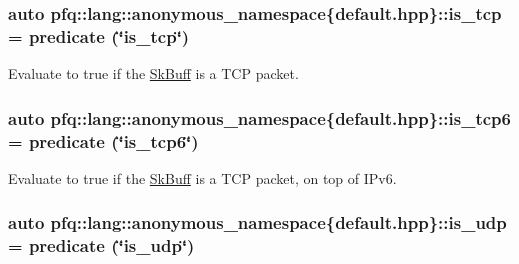 \hypertarget{namespacepfq_1_1lang_1_1anonymous__namespace_02default_8hpp_03_a67fe3072aa5353c1526aa04320d40137}{
\subsubsection[{is\+\_\+tcp}]{\setlength{\rightskip}{0pt plus 5cm}auto pfq\+::lang\+::anonymous\+\_\+namespace\{default.\+hpp\}\+::is\+\_\+tcp = {\bf predicate} (\char`\"{}is\+\_\+tcp\char`\"{})}}\label{namespacepfq_1_1lang_1_1anonymous__namespace_02default_8hpp_03_a67fe3072aa5353c1526aa04320d40137}


Evaluate to {\ttfamily true} if the \hyperlink{structpfq_1_1lang_1_1SkBuff}{Sk\+Buff} is a T\+C\+P packet. 

\hypertarget{namespacepfq_1_1lang_1_1anonymous__namespace_02default_8hpp_03_a56d9bafc51ca6775da4ec3b816b1c7bb}{
\subsubsection[{is\+\_\+tcp6}]{\setlength{\rightskip}{0pt plus 5cm}auto pfq\+::lang\+::anonymous\+\_\+namespace\{default.\+hpp\}\+::is\+\_\+tcp6 = {\bf predicate} (\char`\"{}is\+\_\+tcp6\char`\"{})}}\label{namespacepfq_1_1lang_1_1anonymous__namespace_02default_8hpp_03_a56d9bafc51ca6775da4ec3b816b1c7bb}


Evaluate to {\ttfamily true} if the \hyperlink{structpfq_1_1lang_1_1SkBuff}{Sk\+Buff} is a T\+C\+P packet, on top of I\+Pv6. 

\hypertarget{namespacepfq_1_1lang_1_1anonymous__namespace_02default_8hpp_03_a42701f36d9dde7f3636b90244d520a16}{
\subsubsection[{is\+\_\+udp}]{\setlength{\rightskip}{0pt plus 5cm}auto pfq\+::lang\+::anonymous\+\_\+namespace\{default.\+hpp\}\+::is\+\_\+udp = {\bf predicate} (\char`\"{}is\+\_\+udp\char`\"{})}}\label{namespacepfq_1_1lang_1_1anonymous__namespace_02default_8hpp_03_a42701f36d9dde7f3636b90244d520a16}


